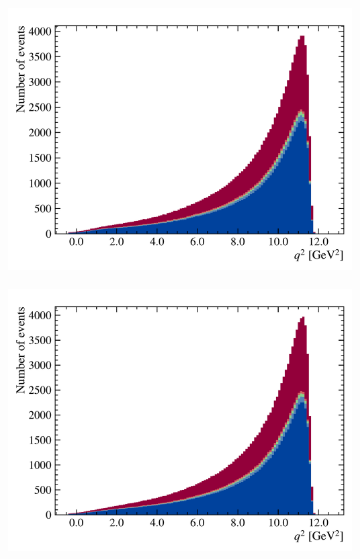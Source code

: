 \begin{figure}[!htb]
\begin{subfigure}[b]{0.32\textwidth}
        \includegraphics[width=\textwidth]{figs-fit-fit-templates/data-driven-plots/misid/D0_q2.pdf}
    \end{subfigure}
    \hfill
    \begin{subfigure}[b]{0.32\textwidth}
        \centering
        \includegraphics[width=\textwidth]{figs-fit-fit-templates/data-driven-plots/misid/D0_q2_smr.pdf}
    \end{subfigure}
    \hfill
    \begin{subfigure}[b]{0.32\textwidth}
        \centering

\end{subfigure}
\end{figure}
